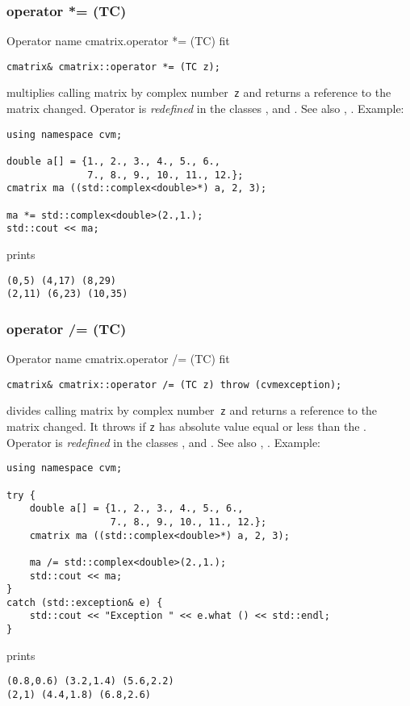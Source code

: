 \subsubsection{operator *= (TC)}
Operator%
\pdfdest name {cmatrix.operator *= (TC)} fit
\begin{verbatim}
cmatrix& cmatrix::operator *= (TC z);
\end{verbatim}
multiplies  calling matrix by  complex number~\verb"z"
and returns a reference to
the matrix changed.
Operator is \emph{redefined} in the classes
,  
and .
See also ,
.
Example:
\begin{Verbatim}
using namespace cvm;

double a[] = {1., 2., 3., 4., 5., 6.,
              7., 8., 9., 10., 11., 12.};
cmatrix ma ((std::complex<double>*) a, 2, 3);

ma *= std::complex<double>(2.,1.);
std::cout << ma;
\end{Verbatim}
prints
\begin{Verbatim}
(0,5) (4,17) (8,29)
(2,11) (6,23) (10,35)
\end{Verbatim}
\newpage



\subsubsection{operator /= (TC)}
Operator%
\pdfdest name {cmatrix.operator /= (TC)} fit
\begin{verbatim}
cmatrix& cmatrix::operator /= (TC z) throw (cvmexception);
\end{verbatim}
divides  calling matrix by  complex number~\verb"z"
and returns a reference to
the matrix changed.
It throws  
if \verb"z" has  absolute value equal or less
than the 
.
Operator is \emph{redefined} in the classes
,  
and .
See also ,
.
Example:
\begin{Verbatim}
using namespace cvm;

try {
    double a[] = {1., 2., 3., 4., 5., 6.,
                  7., 8., 9., 10., 11., 12.};
    cmatrix ma ((std::complex<double>*) a, 2, 3);

    ma /= std::complex<double>(2.,1.);
    std::cout << ma;
}
catch (std::exception& e) {
    std::cout << "Exception " << e.what () << std::endl;
}
\end{Verbatim}
prints
\begin{Verbatim}
(0.8,0.6) (3.2,1.4) (5.6,2.2)
(2,1) (4.4,1.8) (6.8,2.6)
\end{Verbatim}
\newpage




